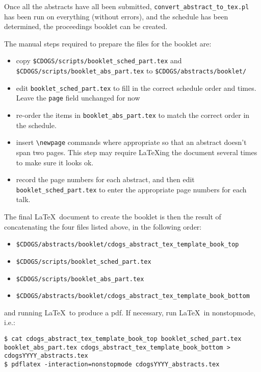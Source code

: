 \documentclass[letterpaper,12pt]{article}
\begin{document}
Once all the abstracts have all been submitted,
\verb|convert_abstract_to_tex.pl| has been run on everything (without
errors), and the schedule has been determined, the proceedings booklet
can be created.

The manual steps required to prepare the files for the booklet are:
\begin{itemize}
\item copy \verb|$CDOGS/scripts/booklet_sched_part.tex| and
  \verb|$CDOGS/scripts/booklet_abs_part.tex| to
  \verb|$CDOGS/abstracts/booklet/|
\item edit \verb|booklet_sched_part.tex| to fill in the correct
  schedule order and times. Leave the \verb|page| field unchanged for
  now
\item re-order the items in \verb|booklet_abs_part.tex| to match the
  correct order in the schedule.
\item insert \verb|\newpage| commands where appropriate so that an
  abstract doesn't span two pages. This step may require \LaTeX ing
  the document several times to make sure it looks ok.
\item record the page numbers for each abstract, and then edit
  \verb|booklet_sched_part.tex| to enter the appropriate page numbers
  for each talk.
\end{itemize}

The final \LaTeX\ document to create the booklet is then the result of
concatenating the four files listed above, in the following order:
\begin{itemize}
\item \verb|$CDOGS/abstracts/booklet/cdogs_abstract_tex_template_book_top|
\item \verb|$CDOGS/scripts/booklet_sched_part.tex|
\item \verb|$CDOGS/scripts/booklet_abs_part.tex|
\item \verb|$CDOGS/abstracts/booklet/cdogs_abstract_tex_template_book_bottom|
\end{itemize}
and running \LaTeX\ to produce a pdf. If necessary, run \LaTeX\ in
nonstopmode, i.e.:
\begin{verbatim}
$ cat cdogs_abstract_tex_template_book_top booklet_sched_part.tex
booklet_abs_part.tex cdogs_abstract_tex_template_book_bottom >
cdogsYYYY_abstracts.tex
$ pdflatex -interaction=nonstopmode cdogsYYYY_abstracts.tex
\end{verbatim}
\end{document}
